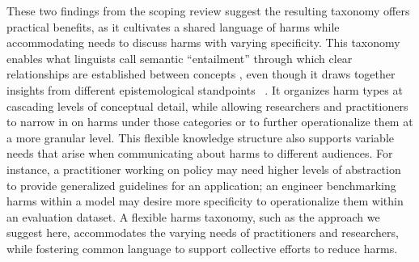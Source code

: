 These two findings from the scoping review suggest the resulting taxonomy offers practical benefits, as it cultivates a shared language of harms while accommodating needs to discuss harms with varying specificity. This taxonomy enables what linguists call semantic “entailment” through which clear relationships are established between concepts \cite{korman2018defining}, even though it draws together insights from different epistemological standpoints ~\cite{harding1991whose, harding1986science}. It organizes harm types at cascading levels of conceptual detail, while allowing researchers and practitioners to narrow in on harms under those categories or to further operationalize them at a more granular level. %
This flexible knowledge structure also supports variable needs that arise when communicating about harms to different audiences. 
For instance, a practitioner working on policy may need higher levels of abstraction to provide generalized guidelines for an application; an engineer benchmarking harms within a model may desire more specificity to operationalize them within an evaluation dataset. 
A flexible harms taxonomy, such as the approach we suggest here, accommodates the varying needs of practitioners and researchers, while fostering common language to support collective efforts to reduce harms.

